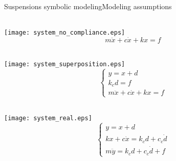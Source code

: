 \begin{frame}{Suspensions symbolic modeling}{Modeling assumptions}
  \begin{minipage}[t]{0.32\linewidth}
    \centering
    \\[3.4em]
    \texttt{[image: system\_no\_compliance.eps]}
    \begin{equation*}
      m \ddot{x} + c \dot{x} + k x = f
    \end{equation*}
  \end{minipage}
  \hfill
  \begin{minipage}[t]{0.32\linewidth}
    \centering
    \\[0.5em]
    \texttt{[image: system\_superposition.eps]}
    \begin{equation*}
      \begin{cases}
        y = x + d  \\
        k_c d = f  \\
        m \ddot{x} + c \dot{x} + k x = f
      \end{cases}
    \end{equation*}
  \end{minipage}
  \hfill
  \begin{minipage}[t]{0.32\linewidth}
    \centering
    \\[0.52em]
    \texttt{[image: system\_real.eps]}
    \begin{equation*}
      \begin{cases}
        y = x + d \\
        k x + c \dot{x} = k_c d + c_c \dot{d} \\
        m \ddot{y} = k_c d + c_c \dot{d} + f
      \end{cases}
    \end{equation*}
  \end{minipage}
\end{frame}


